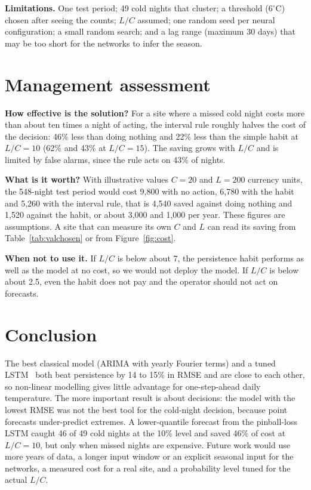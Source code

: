 \documentclass[11pt,a4paper]{article}
\begin{document}
\textbf{Limitations.} One test period; 49 cold nights that cluster; a threshold ($6^\circ$C) chosen after seeing the counts; $L/C$ assumed; one random seed per neural configuration; a small random search; and a lag range (maximum 30 days) that may be too short for the networks to infer the season.

\section{Management assessment}
\textbf{How effective is the solution?} For a site where a missed cold night costs more than about ten times a night of acting, the interval rule roughly halves the cost of the decision: 46\% less than doing nothing and 22\% less than the simple habit at $L/C=10$ (62\% and 43\% at $L/C=15$). The saving grows with $L/C$ and is limited by false alarms, since the rule acts on 43\% of nights.

\textbf{What is it worth?} With illustrative values $C=20$ and $L=200$ currency units, the 548-night test period would cost 9,800 with no action, 6,780 with the habit and 5,260 with the interval rule, that is 4,540 saved against doing nothing and 1,520 against the habit, or about 3,000 and 1,000 per year. These figures are assumptions. A site that can measure its own $C$ and $L$ can read its saving from Table~\ref{tab:valchosen} or from Figure~\ref{fig:cost}.

\textbf{When not to use it.} If $L/C$ is below about 7, the persistence habit performs as well as the model at no cost, so we would not deploy the model. If $L/C$ is below about 2.5, even the habit does not pay and the operator should not act on forecasts.

\section{Conclusion}
The best classical model (ARIMA with yearly Fourier terms) and a tuned LSTM~\cite{hochreiter} both beat persistence by 14 to 15\% in RMSE and are close to each other, so non-linear modelling gives little advantage for one-step-ahead daily temperature. The more important result is about decisions: the model with the lowest RMSE was not the best tool for the cold-night decision, because point forecasts under-predict extremes. A lower-quantile forecast from the pinball-loss LSTM caught 46 of 49 cold nights at the 10\% level and saved 46\% of cost at $L/C=10$, but only when missed nights are expensive. Future work would use more years of data, a longer input window or an explicit seasonal input for the networks, a measured cost for a real site, and a probability level tuned for the actual $L/C$.
\end{document}
